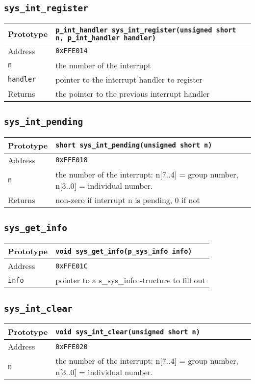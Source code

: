 \subsection*{\texttt{sys\_int\_register}}
\begin{tabular}{|l||l|} \hline
Prototype & \lstinline!p_int_handler sys_int_register(unsigned short n, p_int_handler handler)! \\ \hline
Address & \texttt{0xFFE014} \\ \hline
\lstinline!n! & the number of the interrupt \\ \hline
\lstinline!handler! & pointer to the interrupt handler to register \\ \hline
Returns & the pointer to the previous interrupt handler \\ \hline
\end{tabular}

\subsection*{\texttt{sys\_int\_pending}}
\begin{tabular}{|l||l|} \hline
Prototype & \lstinline!short sys_int_pending(unsigned short n)! \\ \hline
Address & \texttt{0xFFE018} \\ \hline
\lstinline!n! & the number of the interrupt: n[7..4] = group number, n[3..0] = individual number. \\ \hline
Returns & non-zero if interrupt n is pending, 0 if not \\ \hline
\end{tabular}

\subsection*{\texttt{sys\_get\_info}}
\begin{tabular}{|l||l|} \hline
Prototype & \lstinline!void sys_get_info(p_sys_info info)! \\ \hline
Address & \texttt{0xFFE01C} \\ \hline
\lstinline!info! & pointer to a s\_sys\_info structure to fill out \\ \hline
\end{tabular}

\subsection*{\texttt{sys\_int\_clear}}
\begin{tabular}{|l||l|} \hline
Prototype & \lstinline!void sys_int_clear(unsigned short n)! \\ \hline
Address & \texttt{0xFFE020} \\ \hline
\lstinline!n! & the number of the interrupt: n[7..4] = group number, n[3..0] = individual number. \\ \hline
\end{tabular}
